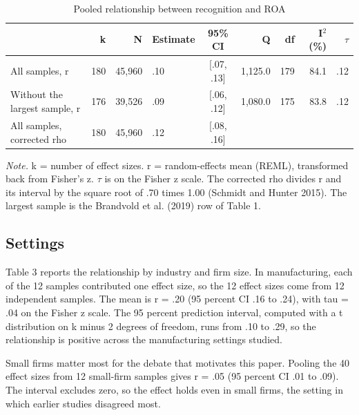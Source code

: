 \documentclass[11pt]{article}
\begin{document}
\begin{table}[H]
\centering
\small
\caption{Pooled relationship between recognition and ROA}
\begin{tabular}{lrrlcrrrr}
\toprule
 & k & N & Estimate & 95\% CI & Q & df & I$^2$ (\%) & $\tau$ \\
\midrule
All samples, r & 180 & 45,960 & .10 & [.07, .13] & 1,125.0 & 179 & 84.1 & .12 \\
Without the largest sample, r & 176 & 39,526 & .09 & [.06, .12] & 1,080.0 & 175 & 83.8 & .12 \\
All samples, corrected rho & 180 & 45,960 & .12 & [.08, .16] & & & & \\
\bottomrule
\end{tabular}

\smallskip
\parbox{0.95\textwidth}{\footnotesize\textit{Note.} k = number of effect sizes. r = random-effects mean (REML), transformed back from Fisher's z. $\tau$ is on the Fisher z scale. The corrected rho divides r and its interval by the square root of .70 times 1.00 (Schmidt and Hunter 2015). The largest sample is the Brandvold et al. (2019) row of Table 1.}
\end{table}

\subsection{Settings}

Table 3 reports the relationship by industry and firm size. In manufacturing, each of the 12 samples contributed one effect size, so the 12 effect sizes come from 12 independent samples. The mean is r = .20 (95 percent CI .16 to .24), with tau = .04 on the Fisher z scale. The 95 percent prediction interval, computed with a t distribution on k minus 2 degrees of freedom, runs from .10 to .29, so the relationship is positive across the manufacturing settings studied.

Small firms matter most for the debate that motivates this paper. Pooling the 40 effect sizes from 12 small-firm samples gives r = .05 (95 percent CI .01 to .09). The interval excludes zero, so the effect holds even in small firms, the setting in which earlier studies disagreed most.
\end{document}
